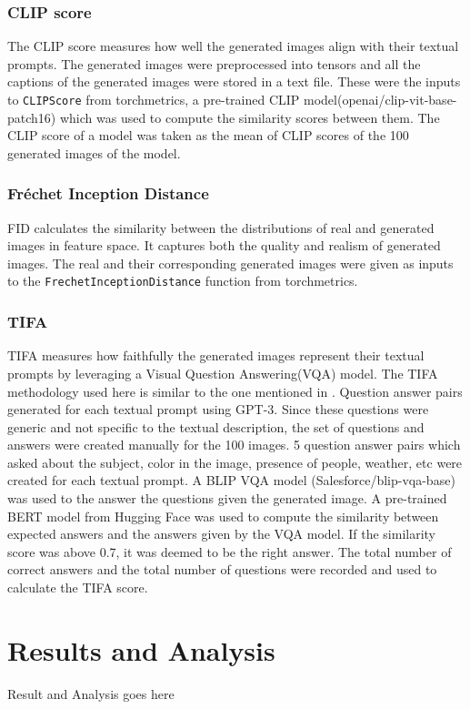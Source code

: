 \documentclass{article}
\begin{document}
\subsubsection{CLIP score}
The CLIP score measures how well the generated images align with their textual prompts. The generated images were 
preprocessed into tensors and all the captions of the generated images were stored in a text file. These were the inputs to \texttt{CLIPScore} from 
torchmetrics, a pre-trained CLIP model(openai/clip-vit-base-patch16) which was 
used to compute the similarity scores between them. The CLIP score of a model was taken as the mean of CLIP scores 
of the 100 generated images of the model. 

\subsubsection{Fréchet Inception Distance}
FID calculates the similarity between the distributions of real and generated images 
in feature space. It captures both the quality and realism of generated images. The real and their corresponding generated images 
were given as inputs to the \texttt{FrechetInceptionDistance} function from torchmetrics.

\subsubsection{TIFA}
TIFA measures how faithfully the generated images represent their textual prompts 
by leveraging a Visual Question Answering(VQA) model. The TIFA methodology used here is similar to the one mentioned in \cite{Yushi2023}. Question answer pairs generated for each 
textual prompt using GPT-3. Since these questions were generic and not specific to the textual description, 
the set of questions and answers were created manually for the 100 images. 5 question answer pairs which asked about 
the subject, color in the image, presence of people, weather, etc were created for each textual prompt. A BLIP VQA model 
(Salesforce/blip-vqa-base) was used to the answer the questions given the generated image. A pre-trained BERT model from Hugging Face 
was used to compute the similarity between expected answers and the answers 
given by the VQA model. If the similarity score was above 0.7, it was deemed to be the right answer. 
The total number of correct answers and the total number of questions were recorded and used to calculate the 
TIFA score.

\section{Results and Analysis}
Result and Analysis goes here
\end{document}
